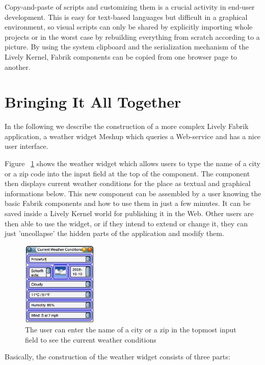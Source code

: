 \documentclass[pdftex, times, 10pt, twocolumn]{article}
\begin{document}
Copy-and-paste of scripts and customizing them is a crucial activity in end-user development.  This is easy for text-based languages but difficult in a graphical environment, so visual scripts can only be shared by explicitly importing whole projects or in the worst case by rebuilding everything from scratch according to a picture.  By using the system clipboard and the serialization mechanism of the Lively Kernel, Fabrik components can be copied from one browser page to another. 



\section{Bringing It All Together}
In the following we describe the construction of a more complex Lively Fabrik application, a weather widget Meshup which queries a Web-service and has a nice user interface. 

Figure ~\ref{fig:WeatherExample} shows the weather widget which allows users to type the name of a city or a zip code into the input field at the top of the component. The component then displays current weather conditions for the place as textual and graphical informations below. This new component can be assembled by a user knowing the basic Fabrik components and how to use them in just a few minutes. It can be saved inside a Lively Kernel world for publishing it in the Web. Other users are then able to use the widget, or if they intend to extend or change it, they can just 'uncollapse' the hidden parts of the application and modify them. 



\begin{figure}[h]\centering
\includegraphics[width=0.320000\textwidth]{weatherExample03.png} 

\caption{The user can enter the name of a city or a zip in the topmost input field to see the current weather conditions }
\label{fig:WeatherExample}
\end{figure}
Basically, the construction of the weather widget consists of three parts: 
\end{document}
